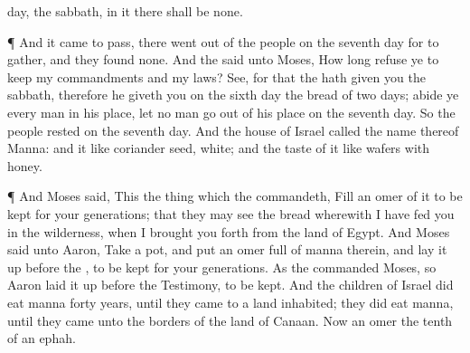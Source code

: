 {day,
{} the
sabbath, in it there shall be none.
\par }{\PP {}¶ And it came to pass,
{} there went
out
{} of the
people on the
seventh
day for to
gather, and they
found none.
And the
{}
said unto
Moses, How long
refuse ye to
keep my
commandments and my
laws?
See, for that the
{} hath
given you the
sabbath, therefore he
giveth you on the
sixth
day the
bread of two
days;
abide ye every
man in his place, let no
man go
out of his
place on the
seventh
day.
So the
people
rested on the
seventh
day.
And the
house of
Israel
called the
name thereof
Manna: and it
{} like
coriander
seed,
white; and the
taste of it
{} like
wafers
{} with
honey.
\par }{\PP {}¶ And
Moses
said, This
{} the
thing which the
{}
commandeth,
Fill an
omer of it to be
kept for your
generations; that they may
see the
bread wherewith I have
fed you in the
wilderness, when I brought you
forth from the
land of
Egypt.
And
Moses
said unto
Aaron,
Take
a
pot, and
put an
omer
full of
manna therein, and lay it
up
before the
{}, to be
kept for your
generations.
As the
{}
commanded
Moses, so
Aaron laid it
up
before the
Testimony, to be
kept.
And the
children of
Israel did
eat
manna
forty
years, until they
came to a
land
inhabited; they did
eat
manna, until they
came unto the
borders of the
land of
Canaan.
Now an
omer
{} the
tenth
{} of an
ephah.

}
